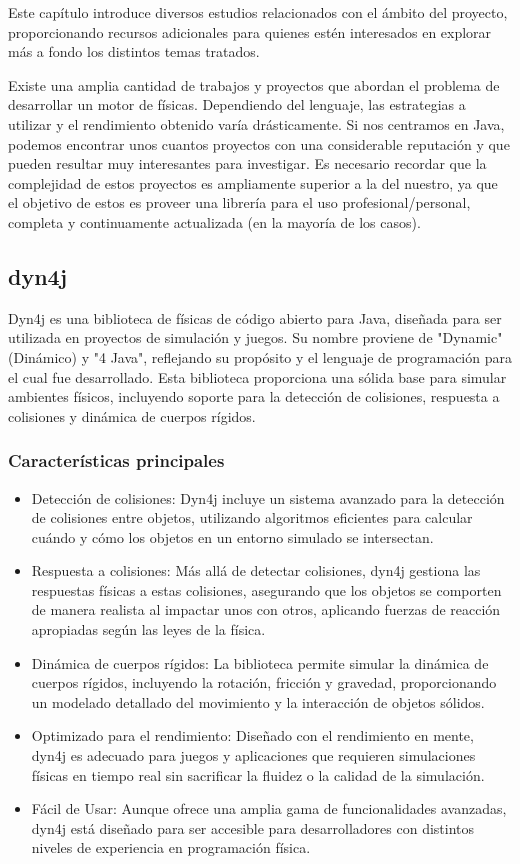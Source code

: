 

Este capítulo introduce diversos estudios relacionados con el ámbito del proyecto, proporcionando recursos adicionales para quienes estén interesados en explorar más a fondo los distintos temas tratados.

Existe una amplia cantidad de trabajos y proyectos que abordan el problema de desarrollar un motor de físicas. Dependiendo del lenguaje, las estrategias a utilizar y el rendimiento obtenido varía drásticamente. Si nos centramos en Java, podemos encontrar unos cuantos proyectos con una considerable reputación y que pueden resultar muy interesantes para investigar. Es necesario recordar que la complejidad de estos proyectos es ampliamente superior a la del nuestro, ya que el objetivo de estos es proveer una librería para el uso profesional/personal, completa y continuamente actualizada (en la mayoría de los casos).

\subsection{dyn4j} 
Dyn4j\cite{dyn4j} es una biblioteca de físicas de código abierto para Java, diseñada para ser utilizada en proyectos de simulación y juegos. Su nombre proviene de "Dynamic" (Dinámico) y "4 Java", reflejando su propósito y el lenguaje de programación para el cual fue desarrollado. Esta biblioteca proporciona una sólida base para simular ambientes físicos, incluyendo soporte para la detección de colisiones, respuesta a colisiones y dinámica de cuerpos rígidos.

\subsubsection{Características principales}
\begin{itemize}
    \item Detección de colisiones: Dyn4j incluye un sistema avanzado para la detección de colisiones entre objetos, utilizando algoritmos eficientes para calcular cuándo y cómo los objetos en un entorno simulado se intersectan.
    \item Respuesta a colisiones: Más allá de detectar colisiones, dyn4j gestiona las respuestas físicas a estas colisiones, asegurando que los objetos se comporten de manera realista al impactar unos con otros, aplicando fuerzas de reacción apropiadas según las leyes de la física.
    \item Dinámica de cuerpos rígidos: La biblioteca permite simular la dinámica de cuerpos rígidos, incluyendo la rotación, fricción y gravedad, proporcionando un modelado detallado del movimiento y la interacción de objetos sólidos.
    \item Optimizado para el rendimiento: Diseñado con el rendimiento en mente, dyn4j es adecuado para juegos y aplicaciones que requieren simulaciones físicas en tiempo real sin sacrificar la fluidez o la calidad de la simulación.
    \item Fácil de Usar: Aunque ofrece una amplia gama de funcionalidades avanzadas, dyn4j está diseñado para ser accesible para desarrolladores con distintos niveles de experiencia en programación física.
\end{itemize}
